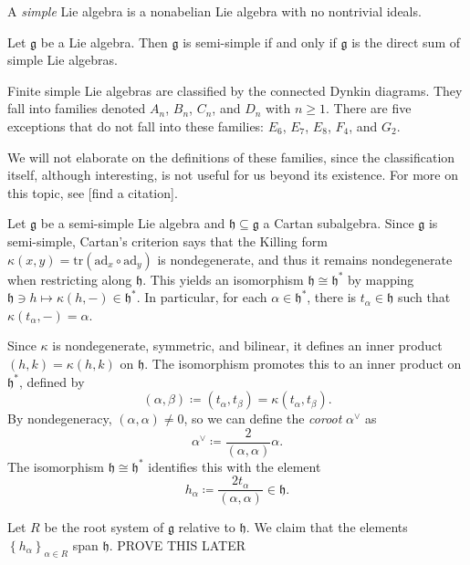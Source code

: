 \documentclass[11pt, letterpaper]{article}
\theoremstyle{plain}
\begin{document}
\begin{definition}\label{dfn:2-7}
	A \emph{simple} Lie algebra is a nonabelian Lie algebra with no nontrivial ideals.
\end{definition}
\begin{proposition}\label{prp:2-8}
	Let $\mathfrak{g} $ be a Lie algebra. Then $\mathfrak{g} $ is semi-simple if and only if $\mathfrak{g}$ is the direct sum of simple Lie algebras.
\end{proposition}

\begin{proposition}\label{prp:2-9}
	Finite simple Lie algebras are classified by the connected Dynkin diagrams. They fall into families denoted $A_n$, $B_n$, $C_n$, and $D_n$ with $n\geq 1$. There are five exceptions that do not fall into these families: $E_6$, $E_7$, $E_8$, $F_4$, and $G_2$.
\end{proposition}
We will not elaborate on the definitions of these families, since the classification itself, although interesting, is not useful for us beyond its existence. For more on this topic, see [find a citation].

Let $\mathfrak{g} $ be a semi-simple Lie algebra and $\mathfrak{h} \subseteq \mathfrak{g} $ a Cartan subalgebra. Since $\mathfrak{g} $ is semi-simple, Cartan's criterion says that the Killing form $\kappa (x,y) = \mathrm{tr} (\mathrm{ad}_x \circ \mathrm{ad}_y)$ is nondegenerate, and thus it remains nondegenerate when restricting along $\mathfrak{h} $. This yields an isomorphism $\mathfrak{h} \cong \mathfrak{h} ^*$ by mapping $\mathfrak{h} \ni h\mapsto \kappa (h,-)\in \mathfrak{h} ^*$. In particular, for each $\alpha \in \mathfrak{h} ^*$, there is $t_\alpha \in \mathfrak{h} $ such that $\kappa (t_\alpha ,-)=\alpha $.

Since $\kappa $ is nondegenerate, symmetric, and bilinear, it defines an inner product $(h,k)=\kappa (h,k)$ on $\mathfrak{h} $. The isomorphism promotes this to an inner product on $\mathfrak{h} ^*$, defined by
\[
	(\alpha ,\beta ) \coloneqq (t_\alpha ,t_\beta ) = \kappa (t_\alpha ,t_\beta )
.\]
By nondegeneracy, $(\alpha ,\alpha )\neq 0$, so we can define the \emph{coroot} $\alpha ^\vee $ as
\[
	\alpha ^\vee \coloneqq \frac{2}{(\alpha ,\alpha )} \alpha 
.\]
The isomorphism $\mathfrak{h} \cong \mathfrak{h} ^*$ identifies this with the element
\[
	h_\alpha \coloneqq \frac{2t_\alpha }{(\alpha ,\alpha )} \in \mathfrak{h} 
.\]

Let $R$ be the root system of $\mathfrak{g} $ relative to $\mathfrak{h} $. We claim that the elements $\left\{ h_\alpha  \right\}_{\alpha \in R} $ span $\mathfrak{h} $. PROVE THIS LATER
\end{document}
